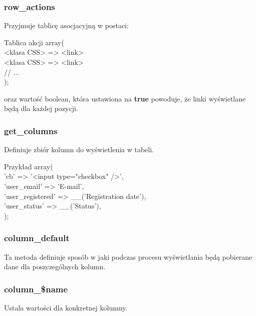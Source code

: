 \documentclass[a4paper, 16pt]{beamer}
\begin{document}
			\begin{frame}
				\frametitle{row\_actions}
				Przyjmuje tablicę asocjacyjną w postaci:
				\begin{exampleblock}{Tablica akcji}
					array(\\
					\hspace{0.5cm}<klasa CSS> => <link>\\
					\hspace{0.5cm}<klasa CSS> => <link>\\
					\hspace{0.5cm}// ...\\
					);
				\end{exampleblock}
				oraz wartość boolean, która ustawiona na \textbf{true} powoduje, że linki wyświetlane będą dla każdej pozycji.
			\end{frame}
			\begin{frame}
				\frametitle{get\_columns}
				Definiuje zbiór kolumn do wyświetlenia w tabeli.
				\begin{exampleblock}{Przykład}
					array(\\
					\hspace{0.5cm}'cb' => '<input type="checkbox" />',\\
            		\hspace{0.5cm}'user\_email' => 'E-mail',\\
            		\hspace{0.5cm}'user\_registered'    => \_\_('Registration date'),\\
            		\hspace{0.5cm}'user_status'   => \_\_('Status'),\\
        			);
				\end{exampleblock}
			\end{frame}

			\begin{frame}
				\frametitle{column\_default}
				Ta metoda definiuje sposób w jaki podczas procesu wyświetlania będą pobierane dane dla poszczególnych kolumn.
			\end{frame}
			\begin{frame}
				\frametitle{column\_\$name}
				Ustala wartości dla konkretnej kolumny.
			\end{frame}
\end{document}
